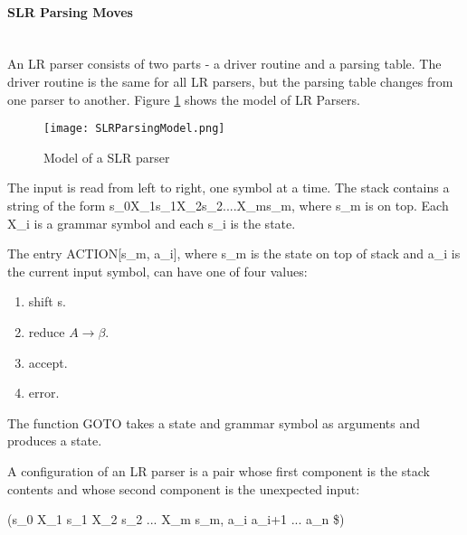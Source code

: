 \paragraph{SLR Parsing Moves}\mbox{}\\
\label{para: SLR Parsing Moves}
An LR parser consists of two parts - a driver routine and a parsing table. The driver routine is the same for all LR parsers, but the parsing table changes from one parser to another. Figure \ref{fig:LR Parser} shows the model of LR Parsers.
\begin{figure}
\centering
\texttt{[image: SLRParsingModel.png]}
\caption{Model of a SLR parser}
\label{fig:LR Parser}
\end{figure}

The input is read from left to right, one symbol at a time. The stack contains a string of the form s_0X_1s_1X_2s_2....X_ms_m, where s_m is on top. Each X_i is a grammar symbol and each s_i is the state.

The entry ACTION[s_m, a_i], where s_m is the state on top of stack and a_i is the current input symbol, can have one of four values:
\begin{enumerate}
\item shift s.
\item reduce $A\rightarrow\beta$.
\item accept.
\item error.
\end{enumerate}
The function GOTO takes a state and grammar symbol as arguments and produces a state.

A configuration of an LR parser is a pair whose first component is the stack contents and whose second component is the unexpected input:

(s_0 X_1 s_1 X_2 s_2 ... X_m s_m, a_i a_{i+1} ... a_n \$)

